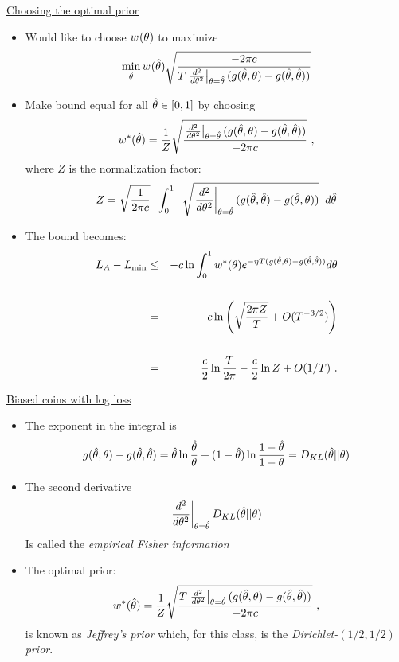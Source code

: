 \begin{flushleft}
\begin{LARGE}
\pagebreak
\begin{center}
\underline{Choosing the optimal prior}
\end{center}
\begin{itemize}
\item
Would like to choose $w^{}(\theta)$ to maximize
\[
	\min_{\hat{\theta}} w^{}(\hat{\theta}) \sqrt{-2 \pi c \over 
T \left. {d^2 \over d\theta^2} \right|_{\theta=\hat{\theta}} 
(g(\hat{\theta},\theta)-g(\hat{\theta},\hat{\theta}))}
\]
\item
Make bound equal for all $\hat{\theta} \in [0,1]$ by choosing
\[
w^{*}(\hat{\theta}) =
{1 \over Z}
\sqrt{\left. {d^2 \over d\theta^2} \right|_{\theta=\hat{\theta}} 
(g(\hat{\theta},\theta)-g(\hat{\theta},\hat{\theta})) \over - 2 \pi c}~,
\]
where $Z$ is the normalization factor:
\[
Z =\sqrt{1 \over 2 \pi c}\;\;
\int_0^1 \;\;\sqrt{\left. {d^2 \over d\theta^2} \right|_{\theta=\hat{\theta}} 
(g(\hat{\theta},\hat{\theta})-g(\hat{\theta},\theta))} \;\;d\hat{\theta}
\]
\item
The bound becomes:
\begin{eqnarray*}
L_A - L_{\min} &\leq&
-c \ln \int_0^1 w^{*}(\theta) 
e^{-\eta T (g(\hat{\theta},\theta) - g(\hat{\theta},\hat{\theta}))} d\theta \\ \\
&=&
-c \ln \left( \sqrt{2\pi Z \over T} + O(T^{-3/2}) \right) \\ \\
&=&
{c \over 2} \ln {T \over 2\pi} -{c \over 2} \ln Z + O(1/T)~.
\end{eqnarray*}
\end{itemize}

\pagebreak
\begin{center}
\underline{Biased coins with log loss}
\end{center}
\begin{itemize}
\item
The exponent in the integral is
\[
g(\hat{\theta},\theta) - g(\hat{\theta},\hat{\theta})
=
\hat{\theta} \ln {\hat{\theta}\over \theta} + 
(1-\hat{\theta}) \ln {1-\hat{\theta}\over 1-\theta}
=
D_{KL} (\hat{\theta} || \theta)
\]
\item
The second derivative
\[
\left. {d^2 \over d\theta^2} \right|_{\theta=\hat{\theta}} 
D_{KL} (\hat{\theta} || \theta)
\]
Is called the {\em empirical Fisher information}
\item
The optimal prior:
\[
w^{*}(\hat{\theta}) ={1 \over Z}
\sqrt{T \left. {d^2 \over d\theta^2} \right|_{\theta=\hat{\theta}} 
(g(\hat{\theta},\theta)-g(\hat{\theta},\hat{\theta})) \over - 2 \pi c}~,
\]
is known as {\em Jeffrey's prior} which, for this class, 
is the {\em Dirichlet-$(1/2,1/2)$ prior}.
\end{itemize}


\end{LARGE}
\end{flushleft}
